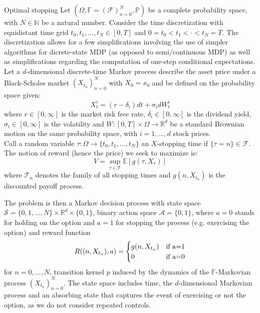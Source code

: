 \documentclass{article}
\begin{document}
\begin{definition}{Optimal stopping}{}
Let $(\Omega, \mathbb{F} = (\mathcal{F})_{n=0}^N, \mathbb{P})$ be a complete probability space, with $N \in \mathbb{N}$ be a natural number. Consider the time discretization with equidistant time grid $t_0, t_1, \ldots, t_N \in [0, T]$ and $0 = t_0 < t_1 < \cdot < t_N = T$. The discretization allows for a few simplifications involving the use of simpler algorithms for dicrete-state MDP (as opposed to semi/continuous MDP) as well as simplifications regarding the computation of one-step conditional expectations. \\
Let a $d$-dimensional discrete-time Markov process describe the asset price under a Black-Scholes market $(X_{t_n})_{n=0}^N$ with $X_0=x_0$ and be defined on the probability space given:
\begin{equation}\label{eq:eq1}
    X_{t}^i = (r-\delta_i)d t + \sigma_i d W_t^i
\end{equation}
where $r \in [0, \infty]$ is the market risk free rate, $\delta_i \in [0, \infty]$ is the dividend yield, $\sigma_i \in [0, \infty]$ is the volatility and $W: [0, T] \times \Omega \rightarrow \mathbb{R}^d$ be a standard Brownian motion on the same probability space, with $i=1, \ldots, d$ stock prices. \\
Call a random variable $\tau: \Omega \rightarrow \{ t_0, t_1, \ldots, t_N \}$ an $X$-stopping time if $\{\tau = n  \} \in \mathcal{F}$. The notion of reward (hence the price) we seek to maximize is: 
\begin{equation}\label{eq:eq2}
    V = \sup_{\tau \in \mathcal{T}} \mathbb{E} [g(\tau, X_{\tau})]
\end{equation}
where $\mathcal{T}_n$ denotes the family of all stopping times and $g(n, X_{t_n})$ is the discounted payoff process.\\
\end{definition}

The problem is then a Markov decision process with state space $\mathcal{S} = \{ 0, 1, \ldots, N \} \times \mathbb{R}^d \times \{0, 1 \}$, binary action space $\mathcal{A}= \{0, 1 \}$, where $a=0$ stands for holding on the option and $a=1$ for stopping the process (e.g. exercising the option) and reward function
\begin{equation}\label{eq:eq3}
    R((n, X_{t_n}), a)=
    \begin{cases}
      g(n, X_{t_n}) & \text{if } $a=1$\\
      0 & \text{if } $a=0$
    \end{cases} 
\end{equation}
for $n=0, \ldots, N$, transition kernel $p$ induced by the dynamics of the $\mathbb{F}$-Markovian process $(X_{t_n})_{n=0}^N$. The state space includes time, the $d$-dimensional Markovian process and an absorbing state that captures the event of exercising or not the option, as we do not consider repeated controls.
\end{document}
